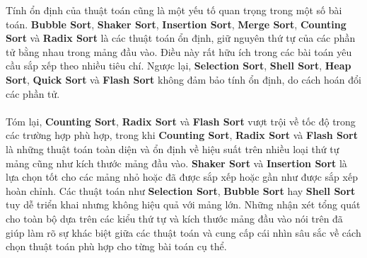 \pagebreak

Tính ổn định của thuật toán cũng là một yếu tố quan trọng trong một số 
bài toán. \textbf{Bubble Sort}, \textbf{Shaker Sort}, \textbf{Insertion 
Sort}, \textbf{Merge Sort}, \textbf{Counting Sort} và \textbf{Radix Sort} 
là các thuật toán ổn định, giữ nguyên thứ tự của các phần tử bằng nhau 
trong mảng đầu vào. Điều này rất hữu ích trong các bài toán yêu cầu sắp 
xếp theo nhiều tiêu chí. Ngược lại, \textbf{Selection Sort}, \textbf{Shell 
Sort}, \textbf{Heap Sort}, \textbf{Quick Sort} và \textbf{Flash Sort} 
không đảm bảo tính ổn định, do cách hoán đổi các phần tử. 
\\\\
Tóm lại, \textbf{Counting Sort}, \textbf{Radix Sort} và \textbf{Flash Sort} 
vượt trội về tốc độ trong các trường hợp phù hợp, trong khi \textbf{Counting 
Sort}, \textbf{Radix Sort} và \textbf{Flash Sort} là những thuật toán toàn 
diện và ổn định về hiệu suất trên nhiều loại thứ tự mảng cũng như kích 
thước mảng đầu vào. \textbf{Shaker Sort} và \textbf{Insertion Sort} là lựa 
chọn tốt cho các mảng nhỏ hoặc đã được sắp xếp hoặc gần như được sắp xếp 
hoàn chỉnh. Các thuật toán như \textbf{Selection Sort}, \textbf{Bubble Sort} 
hay \textbf{Shell Sort} tuy dễ triển khai nhưng không hiệu quả với mảng lớn. 
Những nhận xét tổng quát cho toàn bộ dựa trên các kiểu thứ tự và kích thước 
mảng đầu vào nói trên đã giúp làm rõ sự khác biệt giữa các thuật toán và 
cung cấp cái nhìn sâu sắc về cách chọn thuật toán phù hợp cho từng bài toán 
cụ thể.